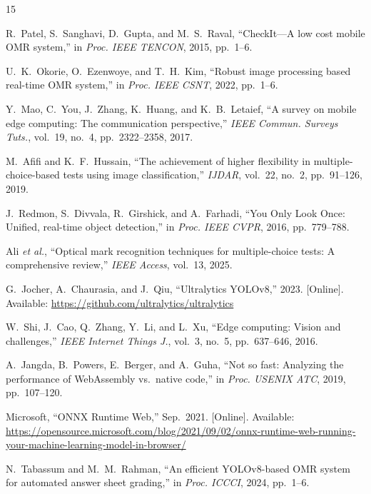 \documentclass[conference]{IEEEtran}
\begin{document}
\begin{thebibliography}{15}

R.~Patel, S.~Sanghavi, D.~Gupta, and M.~S.~Raval,
``CheckIt---A low cost mobile OMR system,''
in \textit{Proc. IEEE TENCON}, 2015, pp.~1--6.

U.~K.~Okorie, O.~Ezenwoye, and T.~H.~Kim,
``Robust image processing based real-time OMR system,''
in \textit{Proc. IEEE CSNT}, 2022, pp.~1--6.

Y.~Mao, C.~You, J.~Zhang, K.~Huang, and K.~B.~Letaief,
``A survey on mobile edge computing: The communication perspective,''
\textit{IEEE Commun. Surveys Tuts.}, vol.~19, no.~4,
pp.~2322--2358, 2017.

M.~Afifi and K.~F.~Hussain,
``The achievement of higher flexibility in multiple-choice-based tests
using image classification,''
\textit{IJDAR}, vol.~22, no.~2, pp.~91--126, 2019.

J.~Redmon, S.~Divvala, R.~Girshick, and A.~Farhadi,
``You Only Look Once: Unified, real-time object detection,''
in \textit{Proc. IEEE CVPR}, 2016, pp.~779--788.

Ali \textit{et al.},
``Optical mark recognition techniques for multiple-choice tests:
A comprehensive review,''
\textit{IEEE Access}, vol.~13, 2025.

G.~Jocher, A.~Chaurasia, and J.~Qiu,
``Ultralytics YOLOv8,'' 2023.
[Online]. Available: \url{https://github.com/ultralytics/ultralytics}

W.~Shi, J.~Cao, Q.~Zhang, Y.~Li, and L.~Xu,
``Edge computing: Vision and challenges,''
\textit{IEEE Internet Things J.}, vol.~3, no.~5,
pp.~637--646, 2016.

A.~Jangda, B.~Powers, E.~Berger, and A.~Guha,
``Not so fast: Analyzing the performance of WebAssembly vs.\ native
code,'' in \textit{Proc. USENIX ATC}, 2019, pp.~107--120.

Microsoft,
``ONNX Runtime Web,'' Sep.~2021.
[Online]. Available:
\url{https://opensource.microsoft.com/blog/2021/09/02/onnx-runtime-web-running-your-machine-learning-model-in-browser/}

N.~Tabassum and M.~M.~Rahman,
``An efficient YOLOv8-based OMR system for automated answer sheet
grading,'' in \textit{Proc. ICCCI}, 2024, pp.~1--6.


\end{thebibliography}
\end{document}
